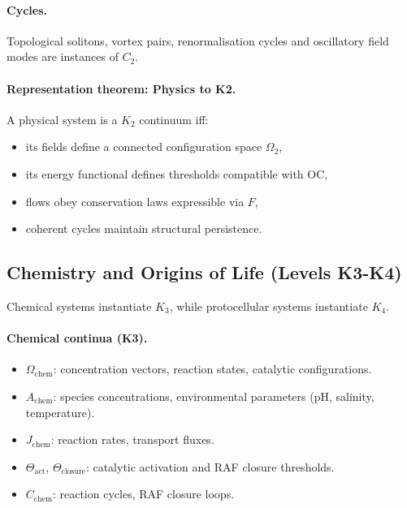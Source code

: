 \paragraph{Cycles.}
Topological solitons, vortex pairs, renormalisation cycles and oscillatory
field modes are instances of \(C_2\).

\paragraph{Representation theorem: Physics to K2.}
A physical system is a \(K_2\) continuum iff:
\begin{itemize}
  \item its fields define a connected configuration space \(\Omega_2\),
  \item its energy functional defines thresholds compatible with OC,
  \item flows obey conservation laws expressible via \(F\),
  \item coherent cycles maintain structural persistence.
\end{itemize}

\subsection{Chemistry and Origins of Life (Levels K3-K4)}

Chemical systems instantiate \(K_3\), while protocellular systems instantiate
\(K_4\).

\paragraph{Chemical continua (K3).}
\begin{itemize}
  \item \(\Omega_{\mathrm{chem}}\): concentration vectors, reaction states,
        catalytic configurations.
  \item \(A_{\mathrm{chem}}\): species concentrations, environmental parameters
        (pH, salinity, temperature).
  \item \(J_{\mathrm{chem}}\): reaction rates, transport fluxes.
  \item \(\Theta_{\mathrm{act}}\), \(\Theta_{\mathrm{closure}}\):
        catalytic activation and RAF closure thresholds.
  \item \(C_{\mathrm{chem}}\): reaction cycles, RAF closure loops.
\end{itemize}

